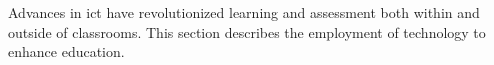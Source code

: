 Advances in \acrfull{ict} have revolutionized learning
and assessment both within and outside of classrooms. This section describes the employment of technology to enhance education.

% 

% 

% 

% 

% 